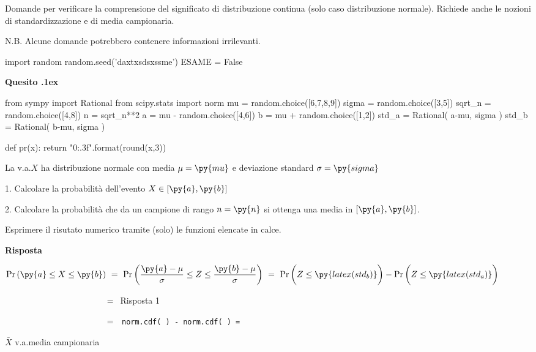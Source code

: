 \documentclass[11pt,twoside,a4paper]{article}
\def\Pr{{\rm Pr\,}}
\newcounter{quesito}
\newenvironment{question}{\addtocounter{quesito}{1}\bigskip\bigskip\par\textbf{Quesito \thequesito.\kern1ex}}{\vspace{\parskip}}
\newenvironment{answer}{\par\textbf{Risposta\quad}}{\vspace{\parskip}}
\begin{document}
\colorbox{blue!10}{\begin{minipage}{\textwidth}
Domande per verificare la comprensione del significato di distribuzione continua (solo caso distribuzione normale). Richiede anche le nozioni di standardizzazione e di media campionaria.\medskip

N.B. Alcune domande potrebbero contenere informazioni irrilevanti.
\end{minipage}}
\bigskip\bigskip


\begin{pycode}
import random
random.seed('daxtxsdsxssme')
ESAME = False
\end{pycode}

\begin{question} 
\begin{pycode}
from sympy import Rational
from scipy.stats import norm
mu = random.choice([6,7,8,9])
sigma = random.choice([3,5])
sqrt_n = random.choice([4,8])
n = sqrt_n**2
a = mu - random.choice([4,6])
b = mu + random.choice([1,2])
std_a = Rational( a-mu, sigma )
std_b = Rational( b-mu, sigma )

def pr(x):
    return "{0:.3f}".format(round(x,3))
\end{pycode}
La v.a.\@ $X$ ha distribuzione normale con media $\mu=\py{mu}$ e deviazione standard $\sigma=\py{sigma}$ 

1. Calcolare la probabilità dell'evento $X\in [\py{a},\py{b}]$ 

2. Calcolare la probabilità che da un campione di rango $n=\py{n}$ si ottenga una media in $[\py{a},\py{b}]$. 

Esprimere il risutato numerico tramite (solo) le funzioni elencate in calce.
\begin{answer}


$\displaystyle \Pr(\py{a}\le X\le\py{b})
\ =\ 
\Pr\bigg(\dfrac{\py{a}-\mu}{\sigma}\le Z\le\dfrac{\py{b}-\mu}{\sigma}\bigg)
\ =\  
\Pr\bigg(Z\le\py{latex(std_b)}\bigg) -  \Pr\bigg(Z\le\py{latex(std_a)}\bigg)$ 

$\phantom{\Pr\py{a}\le X\le\py{b})}
\ =\ 
${ 
\hfill Risposta 1}

$\phantom{\Pr\py{a}\le X\le\py{b})}
\ =\ 
${\tt\ norm.cdf(  ) -  norm.cdf(  )
= 
}

$\bar X$ v.a.\@ media campionaria


\end{answer}
\end{question}
\end{document}
